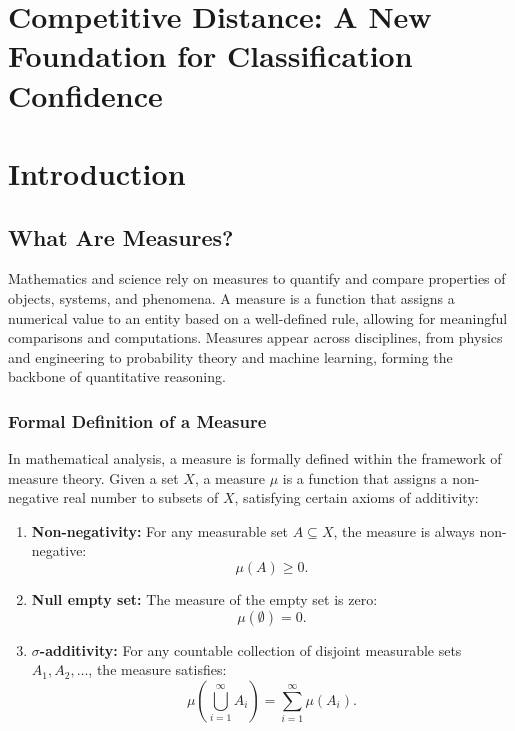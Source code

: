 \documentclass[12pt]{article}
\begin{document}
\section*{Competitive Distance: A New Foundation for Classification Confidence}

\section{Introduction}
\subsection{What Are Measures?}

Mathematics and science rely on measures to quantify and compare properties of objects, systems, and phenomena. A measure is a function that assigns a numerical value to an entity based on a well-defined rule, allowing for meaningful comparisons and computations. Measures appear across disciplines, from physics and engineering to probability theory and machine learning, forming the backbone of quantitative reasoning.

\subsubsection{Formal Definition of a Measure}

In mathematical analysis, a measure is formally defined within the framework of measure theory. Given a set \( X \), a measure \( \mu \) is a function that assigns a non-negative real number to subsets of \( X \), satisfying certain axioms of additivity:

\begin{enumerate}
    \item \textbf{Non-negativity:} For any measurable set \( A \subseteq X \), the measure is always non-negative:
    \[
    \mu(A) \geq 0.
    \]
    \item \textbf{Null empty set:} The measure of the empty set is zero:
    \[
    \mu(\emptyset) = 0.
    \]
    \item \textbf{\(\sigma\)-additivity:} For any countable collection of disjoint measurable sets \( A_1, A_2, \dots \), the measure satisfies:
    \[
    \mu\left(\bigcup_{i=1}^{\infty} A_i\right) = \sum_{i=1}^{\infty} \mu(A_i).
    \]
\end{enumerate}
\end{document}
